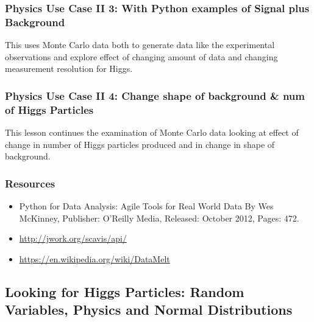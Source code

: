 
\subsubsection{Physics Use Case II 3: With Python examples of Signal
plus
Background}\label{physics-use-case-ii-3-with-python-examples-of-signal-plus-background}

This uses Monte Carlo data both to generate data like the experimental
observations and explore effect of changing amount of data and changing
measurement resolution for Higgs.


\subsubsection{Physics Use Case II 4: Change shape of background \& num
of Higgs
Particles}\label{physics-use-case-ii-4-change-shape-of-background-num-of-higgs-particles}

This lesson continues the examination of Monte Carlo data looking at
effect of change in number of Higgs particles produced and in change in
shape of background.


\subsubsection{Resources}\label{resources-1}

\begin{itemize}

\item
  Python for Data Analysis: Agile Tools for Real World Data By Wes
  McKinney, Publisher: O'Reilly Media, Released: October 2012, Pages:
  472.
\item
  \url{http://jwork.org/scavis/api/}
\item
  \url{https://en.wikipedia.org/wiki/DataMelt}
\end{itemize}

\subsection{Looking for Higgs Particles: Random Variables, Physics and
Normal
Distributions}\label{looking-for-higgs-particles-random-variables-physics-and-normal-distributions}

